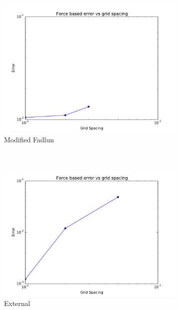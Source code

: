 \begin{figure}[!htb]
	\centering
	\begin{subfigure}{0.3\textwidth}
		\includegraphics[width=\linewidth]{error_fadlun}
		\caption{Modified Fadlun}
	\end{subfigure}
	~
	\begin{subfigure}{0.3\textwidth}
		\includegraphics[width=\linewidth]{error_external}
		\caption{External}
	\end{subfigure}
	~
	\begin{subfigure}{0.3\textwidth}

\end{subfigure}
\end{figure}
